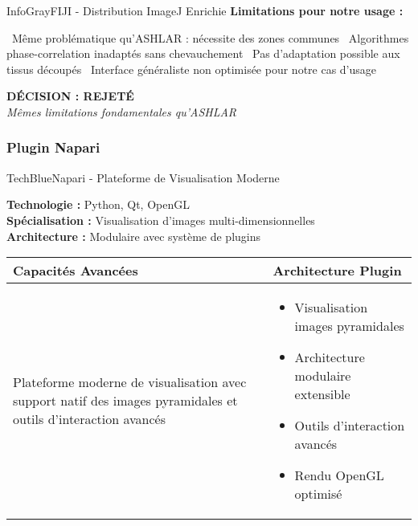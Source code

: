 \documentclass[12pt,a4paper]{report}
\newcommand{\con}[1]{\textcolor{DangerRed}{\faTimes\ #1}}
\begin{document}
\begin{}
\begin{}
\begin{}
\begin{}
\begin{techbox}{InfoGray}{FIJI - Distribution ImageJ Enrichie}
\textbf{Limitations pour notre usage :}
\begin{itemize}[leftmargin=*]
    \con{Même problématique qu'ASHLAR : nécessite des zones communes}
    \con{Algorithmes phase-correlation inadaptés sans chevauchement}
    \con{Pas d'adaptation possible aux tissus découpés}
    \con{Interface généraliste non optimisée pour notre cas d'usage}
\end{itemize}

\begin{center}
\textbf{\textcolor{DangerRed}{DÉCISION : REJETÉ}}\\
\textit{Mêmes limitations fondamentales qu'ASHLAR}
\end{center}

\end{techbox}

\subsubsection{Plugin Napari}

\begin{techbox}{TechBlue}{Napari - Plateforme de Visualisation Moderne}

\textbf{Technologie :} Python, Qt, OpenGL \\
\textbf{Spécialisation :} Visualisation d'images multi-dimensionnelles \\
\textbf{Architecture :} Modulaire avec système de plugins

\vspace{0.5cm}

\begin{tabularx}{\textwidth}{|X|X|}
\hline
\rowcolor{LightGray}
\textbf{Capacités Avancées} & \textbf{Architecture Plugin} \\
\hline
Plateforme moderne de visualisation avec support natif des images pyramidales et outils d'interaction avancés &
\begin{itemize}[nosep]
\item Visualisation images pyramidales
\item Architecture modulaire extensible
\item Outils d'interaction avancés
\item Rendu OpenGL optimisé
\end{itemize} \\
\hline
\end{tabularx}

\vspace{0.5cm}


\end{techbox}
\end{}
\end{}
\end{}
\end{}
\end{document}
